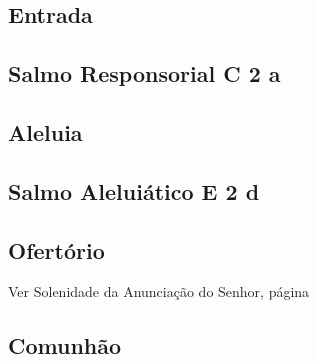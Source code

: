 
\subsection{Entrada}\label{subsection:proprium-sanctorum/in-conceptione-immaculata-bmv/introitus}

\AllowPageFlush

\subsection[Salmo Responsorial]{Salmo Responsorial \textmd{C 2 a}}\label{subsection:proprium-sanctorum/in-conceptione-immaculata-bmv/psalmus-responsorius}

\AllowPageFlush

\subsection{Aleluia}\label{subsection:proprium-sanctorum/in-conceptione-immaculata-bmv/alleluia}

\AllowPageFlush

\subsection[Salmo Aleluiático]{Salmo Aleluiático \textmd{E 2 d}}\label{subsection:proprium-sanctorum/in-conceptione-immaculata-bmv/psalmus-alleluiaticus}

\AllowPageFlush

\subsection{Ofertório}\label{subsection:proprium-sanctorum/in-conceptione-immaculata-bmv/offertorium}

\begin{rubrica}
  Ver Solenidade da Anunciação do Senhor, pági\-na~\pageref{subsection:proprium-sanctorum/in-annuntiatione-domini/offertorium}
\end{rubrica}

\AllowPageFlush

\subsection{Comunhão}\label{subsection:proprium-sanctorum/in-conceptione-immaculata-bmv/communio}
